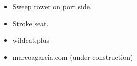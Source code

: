 \documentclass[10pt,a4paper,ragged2e,withhyper]{altacv}
\begin{document}
\begin{paracol}{2}
      \begin{itemize}
      \item Sweep rower on port side.
      \item Stroke seat.
      \end{itemize}
      
      \begin{itemize}
      \item wildcat.plus
      \item marcoagarcia.com (under construction)
      \end{itemize}
      

    \end{paracol}

  
\end{document}
